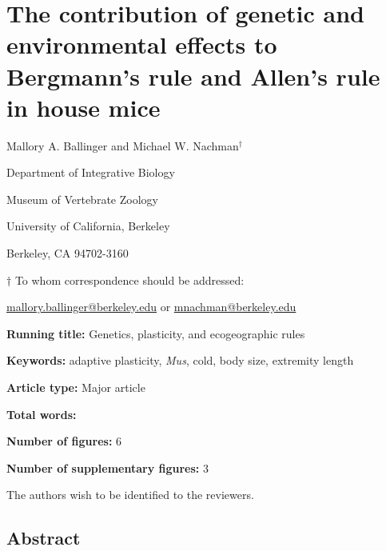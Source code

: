 \documentclass[]{article}
\author{}
\date{\vspace{-2.5em}}
\begin{document}
\hypertarget{the-contribution-of-genetic-and-environmental-effects-to-bergmanns-rule-and-allens-rule-in-house-mice}{%
\section{The contribution of genetic and environmental effects to
Bergmann's rule and Allen's rule in house
mice}\label{the-contribution-of-genetic-and-environmental-effects-to-bergmanns-rule-and-allens-rule-in-house-mice}}

\vspace{20mm}

Mallory A. Ballinger and Michael W. Nachman\({^\dagger}\)

\vspace{20mm}

Department of Integrative Biology

Museum of Vertebrate Zoology

University of California, Berkeley

Berkeley, CA 94702-3160

\vspace{10mm}

\({\dagger}\) To whom correspondence should be addressed:

\href{mailto:mallory.ballinger@berkeley.edu}{mallory.ballinger@berkeley.edu}
or \href{mailto:mnachman@berkeley.edu}{mnachman@berkeley.edu}

\vspace{30mm}

\textbf{Running title:} Genetics, plasticity, and ecogeographic rules

\textbf{Keywords:} adaptive plasticity, \emph{Mus}, cold, body size,
extremity length

\textbf{Article type:} Major article

\textbf{Total words:}

\textbf{Number of figures:} 6

\textbf{Number of supplementary figures:} 3

\vspace{5mm}

The authors wish to be identified to the reviewers.

\newpage

\hypertarget{abstract}{%
\subsection{Abstract}\label{abstract}}
\end{document}

